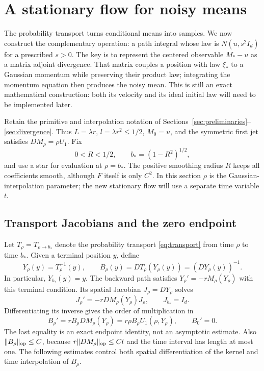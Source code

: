\section{A stationary flow for noisy means}\label{sec:centering}

The probability transport turns conditional means into samples.  We now
construct the complementary operation: a path integral whose law is
$N(u,s^2I_d)$ for a prescribed $s>0$.  The key is to represent the centered
observable $M_*-u$ as a matrix adjoint divergence.  That matrix couples a
position with law $\xi_*$ to a Gaussian momentum while preserving their
product law; integrating the momentum equation then produces the noisy
mean.  This is still an exact mathematical construction: both its velocity
and its ideal initial law will need to be implemented later.

Retain the primitive and interpolation notation of
Sections~\ref{sec:preliminaries}--\ref{sec:divergence}.  Thus
$L=\lambda r$, $l=\lambda r^2\le1/2$, $M_0=u$, and the symmetric first
jet satisfies $DM_\rho=\rho U_1$.  Fix
\[
 0<R<1/2,\qquad b_*=(1-R^2)^{1/2},
\]
and use a star for evaluation at $\rho=b_*$.  The positive smoothing
radius $R$ keeps all coefficients smooth, although $F$ itself is only
$C^2$.  In this section $\rho$ is the Gaussian-interpolation parameter;
the new stationary flow will use a separate time variable $t$.

\subsection{Transport Jacobians and the zero endpoint}

Let $T_\rho=T_{\rho\to b_*}$ denote the probability transport
\eqref{eq:transport} from time $\rho$ to time $b_*$.  Given a terminal
position $y$, define
\[
 Y_\rho(y)=T_\rho^{-1}(y),\qquad
 B_\rho(y)=DT_\rho(Y_\rho(y))=(DY_\rho(y))^{-1}.
\]
In particular, $Y_{b_*}(y)=y$.  The backward path satisfies
$Y_\rho'=-rM_\rho(Y_\rho)$ with this terminal condition.  Its spatial
Jacobian $J_\rho=DY_\rho$ solves
\[
 J_\rho'=-rDM_\rho(Y_\rho)J_\rho,\qquad J_{b_*}=I_d.
\]
Differentiating its inverse gives the order of multiplication in
\begin{equation}\label{eq:backward-jacobian}
 B_\rho'=rB_\rho DM_\rho(Y_\rho)
         =r\rho B_\rho U_1(\rho,Y_\rho),\qquad B_0'=0.
\end{equation}
The last equality is an exact endpoint identity, not an asymptotic
estimate.  Also $\|B_\rho\|_{\mathrm{op}}\le C$, because
$r\|DM_\rho\|_{\mathrm{op}}\le Cl$ and the time interval has length at most
one.  The following estimates control both spatial differentiation of
the kernel and time interpolation of $B_\rho$.

